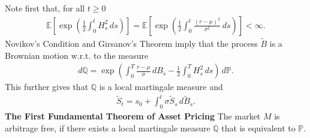 \documentclass{beamer}
\numberwithin{equation}{section}
\newenvironment{frame2}{\begin{frame}\frametitle{{\normalsize \secname} \\ {\large \subsecname}}}{\end{frame}}
\begin{document}
\begin{frame2}
    Note first that, for all $t \geq 0$
    \begin{align*}
        \mathbb{E}\left[\exp\left(\frac{1}{2}\int_0^t H_s^2 \, ds\right)\right] = \mathbb{E}\left[\exp\left(\frac{1}{2}\int_0^t \frac{(r - \mu)^2}{\sigma^2} \, ds\right)\right] < \infty.
    \end{align*}
    Novikov's Condition and Girsanov's Theorem imply that the process $\tilde{B}$ is a Brownian motion w.r.t.\! to the measure
    \begin{align}
        d\mathbb{Q} = \exp\left(\int_0^T \frac{r - \mu}{\sigma}\, dB_s - \frac{1}{2}\int_0^T H_s^2 \, ds\right) \, d\mathbb{P}.
    \end{align}
    This further gives that $\mathbb{Q}$ is a local martingale measure and
    \begin{align}
        \tilde{S}_t = s_0 + \int_0^t\sigma\tilde{S}_s \, d\tilde{B}_s.
    \end{align}
    \textbf{The First Fundamental Theorem of Asset Pricing}\newline
    The market $M$ is arbitrage free, if there exists a local martingale measure $\mathbb{Q}$ that is equivalent to $\mathbb{P}$.
\end{frame2}

\end{document}
